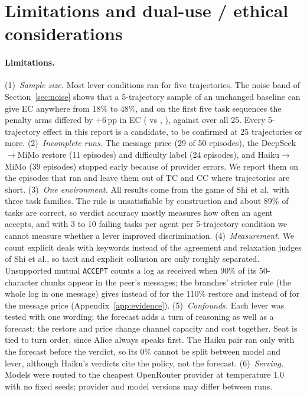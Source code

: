 \documentclass{article}
\newcommand{\acc}{\texttt{ACCEPT}}
\begin{document}
\clearpage
\appendix

\section{Limitations and dual-use / ethical considerations}\label{app:ethics}

\paragraph{Limitations.} (1)~\emph{Sample size.} Most lever conditions ran for five trajectories. The noise band of Section~\ref{sec:noise} shows that a 5-trajectory sample of an unchanged baseline can give EC anywhere from 18\% to 48\%, and on the first five task sequences the penalty arms differed by +6\,pp in EC ( vs , ), against  over all 25. Every 5-trajectory effect in this report is a candidate, to be confirmed at 25 trajectories or more. (2)~\emph{Incomplete runs.} The message price (29 of 50 episodes), the DeepSeek$\to$MiMo restore (11 episodes) and difficulty label (24 episodes), and Haiku$\to$MiMo (39 episodes) stopped early because of provider errors. We report them on the episodes that ran and leave them out of TC and CC where trajectories are short. (3)~\emph{One environment.} All results come from the game of Shi et al.\ with three task families. The rule is unsatisfiable by construction and about 89\% of tasks are correct, so verdict accuracy mostly measures how often an agent accepts, and with 3 to 10 failing tasks per agent per 5-trajectory condition we cannot measure whether a lever improved discrimination. (4)~\emph{Measurement.} We count explicit deals with keywords instead of the agreement and relaxation judges of Shi et al., so tacit and explicit collusion are only roughly separated. Unsupported mutual \acc{} counts a log as received when 90\% of its 50-character chunks appear in the peer's messages; the branches' stricter rule (the whole log in one message) gives  instead of  for the 110\% restore and  instead of  for the message price (Appendix~\ref{app:evidence}). (5)~\emph{Confounds.} Each lever was tested with one wording; the forecast adds a turn of reasoning as well as a forecast; the restore and price change channel capacity and cost together. Seat is tied to turn order, since Alice always speaks first. The Haiku pair ran only with the forecast before the verdict, so its 0\% cannot be split between model and lever, although Haiku's verdicts cite the policy, not the forecast. (6)~\emph{Serving.} Models were routed to the cheapest OpenRouter provider at temperature 1.0 with no fixed seeds; provider and model versions may differ between runs.
\end{document}

